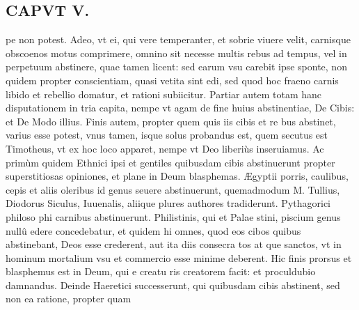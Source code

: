 \documentclass{article}
\begin{document}
\begin{pages}
\section*{CAPVT  V. }
\marginpar{[ p.373 ]}\pstart pe non potest. Adeo, vt ei, qui vere temperanter, et sobrie viuere velit, carnisque obscoenos motus comprimere, omnino sit necesse multis rebus ad tempus, vel in perpetuum abstinere, quae tamen licent: sed earum vsu carebit ipse sponte, non quidem propter conscientiam, quasi vetita sint edi, sed quod hoc fraeno carnis libido et rebellio domatur, et rationi subiicitur. Partiar autem totam hanc disputationem in tria capita, nempe vt agam de fine huius abstinentiae, De Cibis: et De Modo illius.  \pend\pstart Finis autem, propter quem quis iis cibis et re bus abstinet, varius esse potest, vnus tamen, isque solus probandus est, quem secutus est Timotheus, vt ex hoc loco apparet, nempe vt Deo liberiùs inseruiamus.  \pend\pstart Ac primùm quidem Ethnici ipsi et gentiles quibusdam cibis abstinuerunt propter superstitiosas opiniones, et plane in Deum blasphemas. Ægyptii porris, caulibus, cepis et aliis oleribus id genus seuere abstinuerunt, quemadmodum M. Tullius, Diodorus Siculus, Iuuenalis, aliique plures authores tradiderunt. Pythagorici philoso phi carnibus abstinuerunt. Philistinis, qui et Palae stini, piscium genus nullû edere concedebatur, et quidem hi omnes, quod eos cibos quibus abstinebant, Deos esse crederent, aut ita diis consecra tos at que sanctos, vt in hominum mortalium vsu et commercio esse minime deberent. Hic finis prorsus et blasphemus est in Deum, qui e creatu ris creatorem facit: et proculdubio damnandus.  \pend\pstart Deinde Haeretici successerunt, qui quibusdam cibis abstinent, sed non ea ratione, propter quam  \pend

\end{pages}
\end{document}
